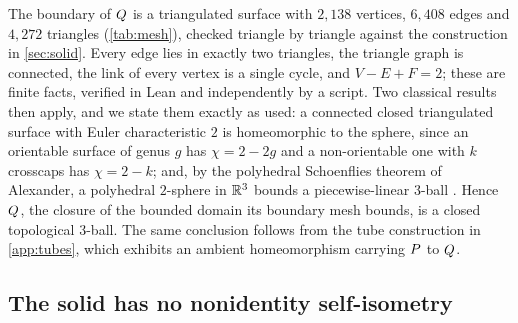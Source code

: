The boundary of $\solid$ is a triangulated surface with $2{,}138$ vertices, $6{,}408$ edges and
$4{,}272$ triangles (\cref{tab:mesh}), checked triangle by triangle against the construction in \cref{sec:solid}. Every edge lies in exactly two triangles, the triangle graph is connected, the link of
every vertex is a single cycle, and $V-E+F=2$; these are finite facts, verified in Lean and
independently by a script. Two classical results then apply, and we state them exactly as used:
a connected closed triangulated surface with Euler characteristic $2$ is homeomorphic to the
sphere, since an orientable surface of genus $g$ has $\chi=2-2g$ and a non-orientable one with $k$
crosscaps has $\chi=2-k$; and, by the polyhedral Schoenflies theorem of Alexander, a polyhedral
$2$-sphere in $\mathbb{R}^3$ bounds a piecewise-linear $3$-ball \cite{Moi77,RS72}. Hence $\solid$, the
closure of the bounded domain its boundary mesh bounds, is a closed topological $3$-ball. The same
conclusion follows from the tube construction in \cref{app:tubes}, which exhibits an ambient homeomorphism
carrying $P$ to $\solid$.

\begin{table}[ht]
  \centering
  \caption{Mesh facts of $\solid$, computed from the solid file with exact arithmetic and
  cross-checked against its recorded counts; the verified statements are ,
   and \texttt{verify/boundary\_sphere.py} (FIGURES.md, Table 5).}
  \label{tab:mesh}
  
\end{table}

\subsection{The solid has no nonidentity self-isometry}\label{app:asymmetry}

